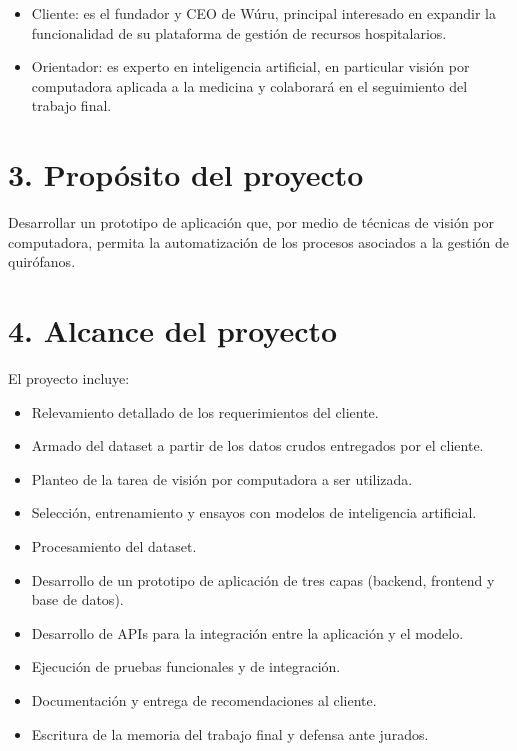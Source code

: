 \documentclass[
11pt, %
]{charter}
\begin{document}
\begin{itemize}
	\item Cliente: \clientename  es el fundador y CEO de Wúru, principal interesado en expandir la funcionalidad de su plataforma de gestión de recursos hospitalarios. 
	\item Orientador: \cosupname es experto en inteligencia artificial, en particular visión por computadora aplicada a la medicina y colaborará en el seguimiento del trabajo final.
\end{itemize}



\section{3. Propósito del proyecto}
\label{sec:proposito}

Desarrollar un prototipo de aplicación que, por medio de técnicas de visión por computadora, permita la automatización de los procesos asociados a la gestión de quirófanos.



\section{4. Alcance del proyecto}
\label{sec:alcance}

El proyecto incluye:
\begin{itemize}
	\item Relevamiento detallado de los requerimientos del cliente.
	\item Armado del dataset a partir de los datos crudos entregados por el cliente.
	\item Planteo de la tarea de visión por computadora a ser utilizada. 
	\item Selección, entrenamiento y ensayos con modelos de inteligencia artificial.
	\item Procesamiento del dataset.
	\item Desarrollo de un prototipo de aplicación de tres capas (backend, frontend y base de datos).
	\item Desarrollo de APIs para la integración entre la aplicación y el modelo.
	\item Ejecución de pruebas funcionales y de integración.
	\item Documentación y entrega de recomendaciones al cliente.
	\item Escritura de la memoria del trabajo final y defensa ante jurados.
	
\end{itemize}
\end{document}

